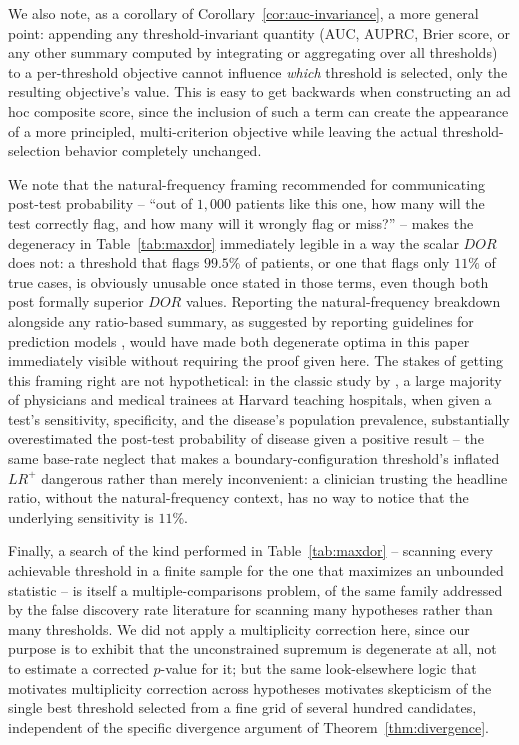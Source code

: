 \documentclass[11pt]{article}
\begin{document}
We also note, as a corollary of Corollary~\ref{cor:auc-invariance}, a more
general point: appending any threshold-invariant quantity (AUC, AUPRC,
Brier score, or any other summary computed by integrating or aggregating
over all thresholds) to a per-threshold objective cannot influence \emph{which}
threshold is selected, only the resulting objective's value. This is easy
to get backwards when constructing an ad hoc composite score, since the
inclusion of such a term can create the appearance of a more principled,
multi-criterion objective while leaving the actual threshold-selection
behavior completely unchanged.

We note that the natural-frequency framing recommended for
communicating post-test probability \citep{gigerenzer1995} -- ``out of
$1{,}000$ patients like this one, how many will the test correctly flag,
and how many will it wrongly flag or miss?'' -- makes the degeneracy in
Table~\ref{tab:maxdor} immediately legible in a way the scalar $DOR$ does
not: a threshold that flags $99.5\%$ of patients, or one that flags only
$11\%$ of true cases, is obviously unusable once stated in those terms,
even though both post formally superior $DOR$ values. Reporting the
natural-frequency breakdown alongside any ratio-based summary, as suggested
by reporting guidelines for prediction models \citep{collins2015,moons2015},
would have made both degenerate optima in this paper immediately visible
without requiring the proof given here. The stakes of getting this framing
right are not hypothetical: in the classic study by \citet{casscells1978},
a large majority of physicians and medical trainees at Harvard teaching
hospitals, when given a test's sensitivity, specificity, and the disease's
population prevalence, substantially overestimated the post-test
probability of disease given a positive result -- the same base-rate
neglect that makes a boundary-configuration threshold's inflated $LR^+$
dangerous rather than merely inconvenient: a clinician trusting the
headline ratio, without the natural-frequency context, has no way to
notice that the underlying sensitivity is $11\%$.

Finally, a search of the kind performed in Table~\ref{tab:maxdor} --
scanning every achievable threshold in a finite sample for the one that
maximizes an unbounded statistic -- is itself a multiple-comparisons
problem, of the same family addressed by the false discovery rate
literature \citep{benjamini1995} for scanning many hypotheses rather than
many thresholds. We did not apply a multiplicity correction here, since our
purpose is to exhibit that the unconstrained supremum is degenerate at all,
not to estimate a corrected $p$-value for it; but the same look-elsewhere
logic that motivates multiplicity correction across hypotheses motivates
skepticism of the single best threshold selected from a fine grid of
several hundred candidates, independent of the specific divergence argument
of Theorem~\ref{thm:divergence}.
\end{document}
